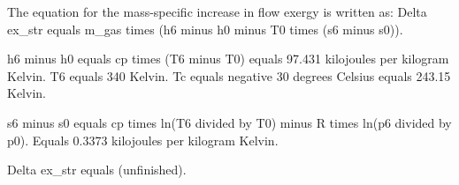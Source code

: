 The equation for the mass-specific increase in flow exergy is written as:  
Delta ex_str equals m_gas times (h6 minus h0 minus T0 times (s6 minus s0)).  

h6 minus h0 equals cp times (T6 minus T0) equals 97.431 kilojoules per kilogram Kelvin.  
T6 equals 340 Kelvin.  
Tc equals negative 30 degrees Celsius equals 243.15 Kelvin.  

s6 minus s0 equals cp times ln(T6 divided by T0) minus R times ln(p6 divided by p0).  
Equals 0.3373 kilojoules per kilogram Kelvin.  

Delta ex_str equals (unfinished).